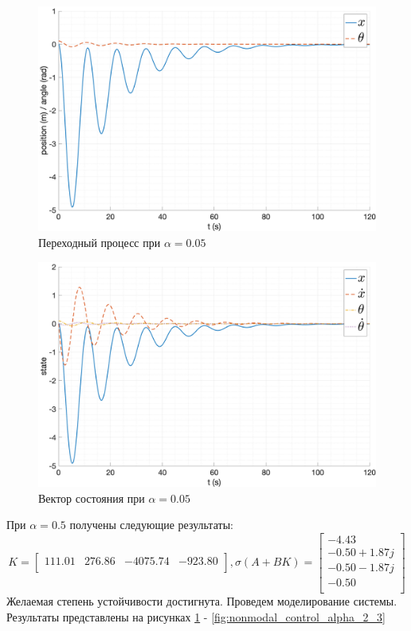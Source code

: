 \begin{figure}[ht!]
    \centering
    \includegraphics[width=\textwidth]{media/plots/nonmodal_controlers_min/out_4.png}
    \caption{Переходный процесс при $\alpha = 0.05$}
    \label{fig:nonmodal_control_alpha_2_1}
\end{figure}
\begin{figure}[ht!]
    \centering
    \includegraphics[width=\textwidth]{media/plots/nonmodal_controlers_min/state_4.png}
    \caption{Вектор состояния при $\alpha = 0.05$}
    \label{fig:nonmodal_control_alpha_2_1_state}
\end{figure}

\FloatBarrier
При $\alpha = 0.5$ получены следующие результаты: 
\begin{equation}
    K = \begin{bmatrix} 111.01  & 276.86  & -4075.74  & -923.80  \\ \end{bmatrix}, \sigma(A + BK) = \begin{bmatrix} -4.43 \\ -0.50 + 1.87j \\ -0.50 - 1.87j \\ -0.50 \\ \end{bmatrix}
\end{equation}
Желаемая степень устойчивости достигнута. Проведем моделирование системы. Результаты 
представлены на рисунках \ref{fig:nonmodal_control_alpha_2_1} - \ref{fig:nonmodal_control_alpha_2_3}

